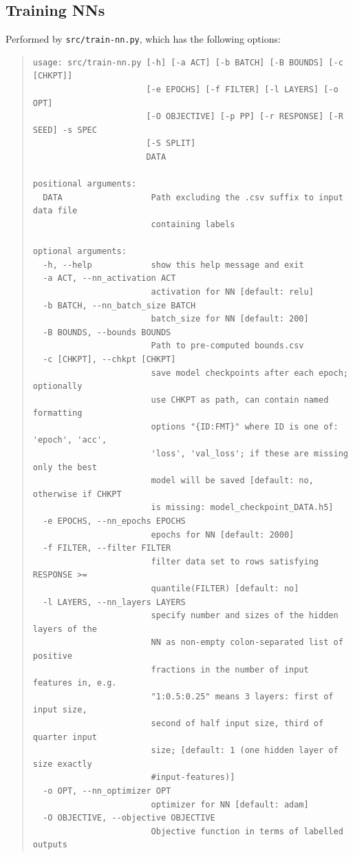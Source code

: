 \documentclass[a4paper,parskip=half]{article} %
\newcommand*\cmdstyle\texttt
\newcommand*\cmd[1]{\cmdstyle{\textcolor{red!85!black}{#1}}}
\newenvironment{cmdhelp}{\begin{quote}\footnotesize}{\end{quote}}
\newcommand*\trainnn{train-nn.py}
\begin{document}
\subsection{Training NNs}
Performed by \cmd{src/\trainnn}, which has the following options:
\begin{cmdhelp}\begin{verbatim}
usage: src/train-nn.py [-h] [-a ACT] [-b BATCH] [-B BOUNDS] [-c [CHKPT]]
                       [-e EPOCHS] [-f FILTER] [-l LAYERS] [-o OPT]
                       [-O OBJECTIVE] [-p PP] [-r RESPONSE] [-R SEED] -s SPEC
                       [-S SPLIT]
                       DATA

positional arguments:
  DATA                  Path excluding the .csv suffix to input data file
                        containing labels

optional arguments:
  -h, --help            show this help message and exit
  -a ACT, --nn_activation ACT
                        activation for NN [default: relu]
  -b BATCH, --nn_batch_size BATCH
                        batch_size for NN [default: 200]
  -B BOUNDS, --bounds BOUNDS
                        Path to pre-computed bounds.csv
  -c [CHKPT], --chkpt [CHKPT]
                        save model checkpoints after each epoch; optionally
                        use CHKPT as path, can contain named formatting
                        options "{ID:FMT}" where ID is one of: 'epoch', 'acc',
                        'loss', 'val_loss'; if these are missing only the best
                        model will be saved [default: no, otherwise if CHKPT
                        is missing: model_checkpoint_DATA.h5]
  -e EPOCHS, --nn_epochs EPOCHS
                        epochs for NN [default: 2000]
  -f FILTER, --filter FILTER
                        filter data set to rows satisfying RESPONSE >=
                        quantile(FILTER) [default: no]
  -l LAYERS, --nn_layers LAYERS
                        specify number and sizes of the hidden layers of the
                        NN as non-empty colon-separated list of positive
                        fractions in the number of input features in, e.g.
                        "1:0.5:0.25" means 3 layers: first of input size,
                        second of half input size, third of quarter input
                        size; [default: 1 (one hidden layer of size exactly
                        #input-features)]
  -o OPT, --nn_optimizer OPT
                        optimizer for NN [default: adam]
  -O OBJECTIVE, --objective OBJECTIVE
                        Objective function in terms of labelled outputs

\end{verbatim}
\end{cmdhelp}
\end{document}
